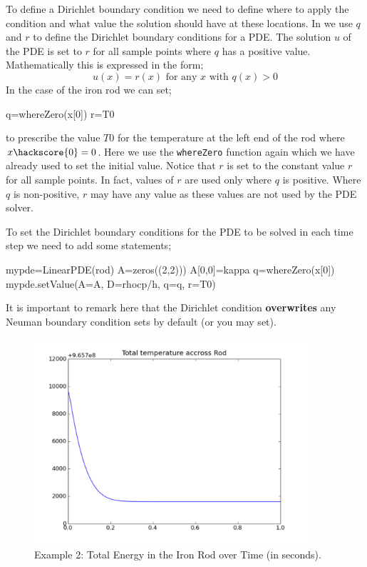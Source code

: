 To define a Dirichlet boundary condition we need to define where to apply the condition and what value the 
solution should have at these locations. In \esc we use $q$ and $r$ to define the Dirichlet boundary conditions
for a PDE. The solution $u$ of the PDE is set to $r$ for all sample points where $q$ has a positive value.
Mathematically this is expressed in the form;
\begin{equation}
  u(x) = r(x) \mbox{ for any } x \mbox{ with } q(x) > 0
\end{equation} 
In the case of the iron rod 
we can set;
\begin{python}
q=whereZero(x[0])
r=T0
\end{python}
to prescribe the value $T0$ for the temperature at the left end of the rod where $x\hackscore{0}=0$. 
Here we use the \verb|whereZero| function again which we have already used to set the initial value.
Notice that $r$ is set to the constant value $r$ for all sample points. In fact, 
values of $r$ are used only where $q$ is positive. Where $q$ is non-positive,
$r$ may have any value as these values are not used by the PDE solver. 

To set the Dirichlet boundary conditions for the PDE to be solved in each time step we need
to add some statements;
\begin{python}
mypde=LinearPDE(rod)
A=zeros((2,2)))
A[0,0]=kappa
q=whereZero(x[0])
mypde.setValue(A=A, D=rhocp/h, q=q, r=T0)
\end{python}
It is important to remark here that the Dirichlet condition \textbf{overwrites} any Neuman boundary 
condition \esc sets by default (or you may set).  

\begin{figure}
\begin{center}
\includegraphics[width=4in]{figures/ttrodpyplot150}
\caption{Example 2: Total Energy in the Iron Rod over Time (in seconds).}
\label{fig:onedheatout1 002} 
\end{center}
\end{figure}

